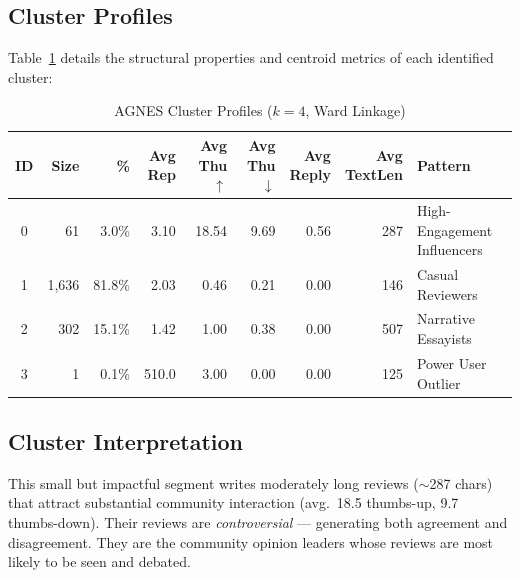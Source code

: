 \documentclass[12pt,a4paper]{article}
\begin{document}
\subsection{Cluster Profiles}

Table~\ref{tab:cluster_profiles} details the structural properties and centroid metrics of each identified cluster:

\begin{table}[H]
\centering
\caption{AGNES Cluster Profiles ($k = 4$, Ward Linkage)}
\label{tab:cluster_profiles}
\small
\begin{tabular}{c r r r r r r r l}
\toprule
\textbf{ID} & \textbf{Size} & \textbf{\%} & \makecell{\textbf{Avg}\\\textbf{Rep}} & \makecell{\textbf{Avg}\\\textbf{Thu$\uparrow$}} & \makecell{\textbf{Avg}\\\textbf{Thu$\downarrow$}} & \makecell{\textbf{Avg}\\\textbf{Reply}} & \makecell{\textbf{Avg}\\\textbf{TextLen}} & \textbf{Pattern} \\
\midrule
0 & 61   & 3.0\%  & 3.10  & 18.54 & 9.69  & 0.56 & 287 & High-Engagement Influencers \\
1 & 1{,}636 & 81.8\% & 2.03  & 0.46  & 0.21  & 0.00 & 146 & Casual Reviewers \\
2 & 302  & 15.1\% & 1.42  & 1.00  & 0.38  & 0.00 & 507 & Narrative Essayists \\
3 & 1    & 0.1\%  & 510.0 & 3.00  & 0.00  & 0.00 & 125 & Power User Outlier \\
\bottomrule
\end{tabular}
\end{table}

\subsection{Cluster Interpretation}

\begin{findingbox}
This small but impactful segment writes moderately long reviews ($\sim$287 chars) that attract substantial community interaction (avg.\ 18.5 thumbs-up, 9.7 thumbs-down). Their reviews are \emph{controversial} --- generating both agreement and disagreement. They are the community opinion leaders whose reviews are most likely to be seen and debated.
\end{findingbox}
\end{document}
